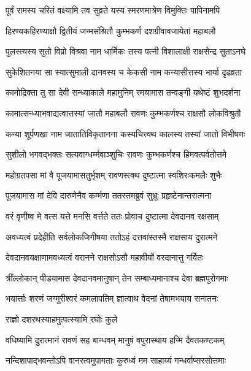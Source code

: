 \twolineshloka
{पूर्वं रामस्य चरितं वक्ष्यामि तव सुव्रते}
{यस्य स्मरणमात्रेण विमुक्तिः पापिनामपि}%

\twolineshloka
{हिरण्यकहिरण्याक्षौ द्वितीयं जन्मसंश्रितौ}
{कुम्भकर्ण दशग्रीवावजायेतां महाबलौ}%

\twolineshloka
{पुलस्त्यस्य सुतो विप्रो विश्रवा नाम धार्मिकः}
{तस्य पत्नी विशालाक्षी राक्षसेन्द्र सुताऽनघे}%

\twolineshloka
{सुकेशितनया सा स्यात्सुमाली दानवस्य च}
{केकसी नाम कन्यासीत्तस्य भार्या दृढव्रता}%

\twolineshloka
{कामोद्रिक्ता तु सा देवी सन्ध्याकाले महामुनिम्}
{रमयामास तन्वङ्गी यथेष्टं शुभदर्शना}%

\twolineshloka
{कामात्सन्ध्याभवाद्यत्वात्तस्यां जातौ महाबलौ}
{रावणः कुम्भकर्णश्च राक्षसौ लोकविश्रुतौ}%

\twolineshloka
{कन्या शूर्पणखा नाम जातातिविकृतानना}
{कस्यचित्त्वथ कालस्य तस्यां जातो विभीषणः}%

\twolineshloka
{सुशीलो भगवद्भक्तः सत्यवाग्धर्म्मवाञ्शुचिः}
{रावणः कुम्भकर्णश्च हिमवत्पर्वतोत्तमे}%

\twolineshloka
{महोग्रतपसा मां वै पूजयामासतुर्भृशम्}
{रावणस्त्वथ दुष्टात्मा स्वशिरःकमलैः शुभैः}%

\twolineshloka
{पूजयामास मां देवि दारुणेनैव कर्म्मणा}
{ततस्तमब्रुवं सुभ्रूः प्रहृष्टेनान्तरात्मना}%

\twolineshloka
{वरं वृणीष्व मे वत्स यत्ते मनसि वर्त्तते}
{ततः प्रोवाच दुष्टात्मा देवदानव रक्षसाम्}%

\twolineshloka
{अवध्यत्वं प्रदेहीति सर्वलोकजिगीषया}
{ततोऽहं दत्तवांस्तस्मै राक्षसाय दुरात्मने}%

\twolineshloka
{देवदानवयक्षाणामवध्यत्वं वरानने}
{राक्षसोऽसौ महावीर्यो वरदानात्तु गर्वितः}%

\twolineshloka
{त्रींल्लोकान् पीडयामास देवदानवमानुषान्}
{तेन सम्बाध्यमानाश्च देवा ब्रह्मपुरोगमाः}%

\twolineshloka
{भयार्त्ताः शरणं जग्मुरीश्वरं कमलापतिम्}
{ज्ञात्वाथ वेदनां तेषामभयाय सनातनः}%


\onelineshloka
{राज्ञो दशरथस्याहमुत्पत्स्यामि रघोः कुले}%

\twolineshloka
{वधिष्यामि दुरात्मानं रावणं सह बान्धवम्}
{मानुषं वपुरास्थाय हन्मि दैवतकण्टकम्}%

\twolineshloka
{नन्दिशापाद्भवन्तोऽपि वानरत्वमुपागताः}
{कुरुध्वं मम साहाय्यं गन्धर्वाप्सरसोत्तमाः}%

